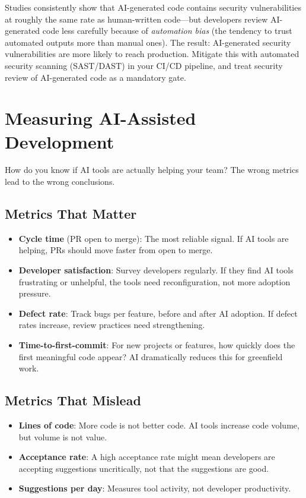 \begin{cautionbox}
Studies consistently show that AI-generated code contains security vulnerabilities at roughly the same rate as human-written code---but developers review AI-generated code less carefully because of \emph{automation bias} (the tendency to trust automated outputs more than manual ones). The result: AI-generated security vulnerabilities are more likely to reach production. Mitigate this with automated security scanning (SAST/DAST) in your CI/CD pipeline, and treat security review of AI-generated code as a mandatory gate.
\end{cautionbox}


\section{Measuring AI-Assisted Development}

How do you know if AI tools are actually helping your team? The wrong metrics lead to the wrong conclusions.

\subsection{Metrics That Matter}

\begin{itemize}[leftmargin=*]
    \item \textbf{Cycle time} (PR open to merge): The most reliable signal. If AI tools are helping, PRs should move faster from open to merge.
    \item \textbf{Developer satisfaction}: Survey developers regularly. If they find AI tools frustrating or unhelpful, the tools need reconfiguration, not more adoption pressure.
    \item \textbf{Defect rate}: Track bugs per feature, before and after AI adoption. If defect rates increase, review practices need strengthening.
    \item \textbf{Time-to-first-commit}: For new projects or features, how quickly does the first meaningful code appear? AI dramatically reduces this for greenfield work.
\end{itemize}

\subsection{Metrics That Mislead}

\begin{itemize}[leftmargin=*]
    \item \textbf{Lines of code}: More code is not better code. AI tools increase code volume, but volume is not value.
    \item \textbf{Acceptance rate}: A high acceptance rate might mean developers are accepting suggestions uncritically, not that the suggestions are good.
    \item \textbf{Suggestions per day}: Measures tool activity, not developer productivity.
\end{itemize}


